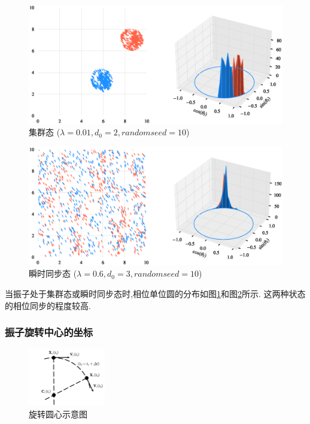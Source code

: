 \documentclass{article}
\begin{document}
\begin{figure}[H]
	\centering
	\includegraphics[width=\textwidth]{./figs/CorrectCoupling_uniform_0.010_2.00.eps}
	\vspace{-1cm}
	\caption{集群态 ($\lambda=0.01, d_0=2, random seed=10$)}
	\label{fig:fig231.3}
\end{figure}

\begin{figure}[H]
	\centering
	\includegraphics[width=\textwidth]{./figs/CorrectCoupling_uniform_0.600_3.00.eps}
	\vspace{-1cm}
	\caption{瞬时同步态 ($\lambda=0.6, d_0=3, random seed=10$)}
	\label{fig:fig231.4}
\end{figure}

当振子处于集群态或瞬时同步态时,相位单位圆的分布如图\ref{fig:fig231.3}和图\ref{fig:fig231.4}所示. 这两种状态的相位同步的程度较高.

\newpage
\subsubsection{振子旋转中心的坐标}

\begin{figure}[H]
	\centering
	\includegraphics[width=0.3\textwidth]{./figs/CenterEps.pdf}
	\vspace{-0.2cm}
	\caption{旋转圆心示意图}
	\label{fig:fig232.1}
\end{figure}
\end{document}
